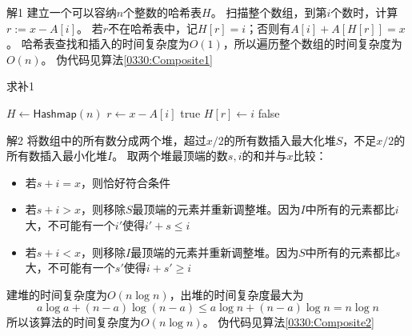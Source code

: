 \begin{questions}
\begin{solution}
        \textsf{解1}\quad
        建立一个可以容纳$n$个整数的哈希表$H$。
        扫描整个数组，到第$i$个数时，计算$r := x - A[i]$。
        若$r$不在哈希表中，记$H[r] = i$；否则有$A[i] + A\left[H[r]\right] = x$。
        哈希表查找和插入的时间复杂度为$O(1)$，所以遍历整个数组的时间复杂度为$O(n)$。
        伪代码见算法\ref{0330:Composite1}
    \end{solution}

    \begin{algorithm}[!htp]
        \caption{求补1}\label{0330:Composite1}
        \begin{algorithmic}[1]
            \State $H \gets \mathsf{Hashmap}(n)$
            \State $r \gets x - A[i]$
            \State \Return \textsf{true} 
            \Else
            \State $H[r] \gets i$
            \EndIf
            \EndFor
            \State \Return \textsf{false}
        \end{algorithmic}
    \end{algorithm}

    \begin{solution}
        \textsf{解2}
        将数组中的所有数分成两个堆，超过$x/2$的所有数插入最大化堆$S$，不足$x/2$的所有数插入最小化堆$I$。
        取两个堆最顶端的数$s,i$的和并与$x$比较：
        \begin{itemize}
            \item 若$s + i = x$，则恰好符合条件
            \item 若$s + i > x$，则移除$S$最顶端的元素并重新调整堆。因为$I$中所有的元素都比$i$大，不可能有一个$i'$使得$i' + s \le i$
            \item 若$s + i < x$，则移除$I$最顶端的元素并重新调整堆。因为$S$中所有的元素都比$s$大，不可能有一个$s'$使得$i + s' \ge i$
        \end{itemize}

        建堆的时间复杂度为$O(n \log n)$，出堆的时间复杂度最大为\[
            a \log a + (n-a) \log (n-a) \le a \log n + (n-a) \log n = n \log n
        \]
        所以该算法的时间复杂度为$O(n\log n)$。
        伪代码见算法\ref{0330:Composite2}

    \end{solution}


\end{questions}

